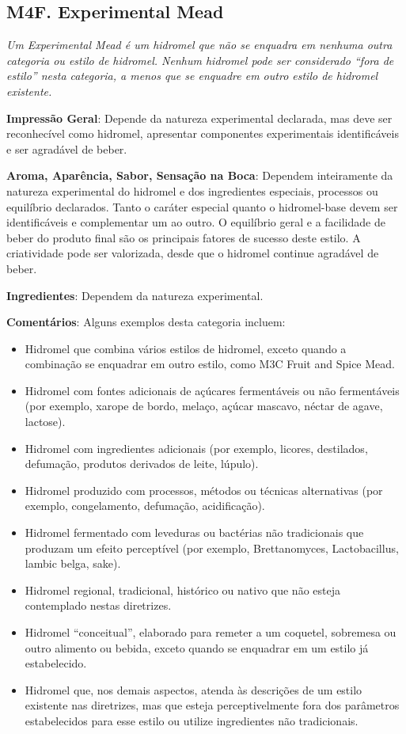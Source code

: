 \subsection*{M4F. Experimental Mead}

\textit{Um Experimental Mead é um hidromel que não se enquadra em nenhuma outra categoria ou estilo de hidromel. Nenhum hidromel pode ser considerado ``fora de estilo'' nesta categoria, a menos que se enquadre em outro estilo de hidromel existente.}

\textbf{Impressão Geral}: Depende da natureza experimental declarada, mas deve ser reconhecível como hidromel, apresentar componentes experimentais identificáveis e ser agradável de beber.

\textbf{Aroma, Aparência, Sabor, Sensação na Boca}: Dependem inteiramente da natureza experimental do hidromel e dos ingredientes especiais, processos ou equilíbrio declarados. Tanto o caráter especial quanto o hidromel-base devem ser identificáveis e complementar um ao outro. O equilíbrio geral e a facilidade de beber do produto final são os principais fatores de sucesso deste estilo. A criatividade pode ser valorizada, desde que o hidromel continue agradável de beber.

\textbf{Ingredientes}: Dependem da natureza experimental.

\textbf{Comentários}: Alguns exemplos desta categoria incluem:

\begin{itemize}

\item Hidromel que combina vários estilos de hidromel, exceto quando a combinação se enquadrar em outro estilo, como M3C Fruit and Spice Mead.
\item Hidromel com fontes adicionais de açúcares fermentáveis ou não fermentáveis (por exemplo, xarope de bordo, melaço, açúcar mascavo, néctar de agave, lactose).
\item Hidromel com ingredientes adicionais (por exemplo, licores, destilados, defumação, produtos derivados de leite, lúpulo).
\item Hidromel produzido com processos, métodos ou técnicas alternativas (por exemplo, congelamento, defumação, acidificação).
\item Hidromel fermentado com leveduras ou bactérias não tradicionais que produzam um efeito perceptível (por exemplo, Brettanomyces, Lactobacillus, lambic belga, sake).
\item Hidromel regional, tradicional, histórico ou nativo que não esteja contemplado nestas diretrizes.
\item Hidromel ``conceitual'', elaborado para remeter a um coquetel, sobremesa ou outro alimento ou bebida, exceto quando se enquadrar em um estilo já estabelecido.
\item Hidromel que, nos demais aspectos, atenda às descrições de um estilo existente nas diretrizes, mas que esteja perceptivelmente fora dos parâmetros estabelecidos para esse estilo ou utilize ingredientes não tradicionais.

\end{itemize}

